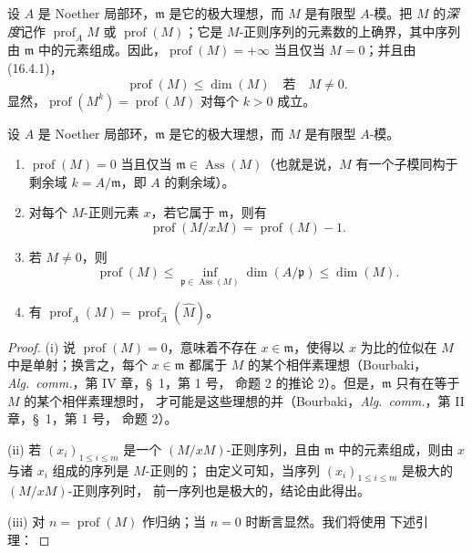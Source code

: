 \begin{definition}[16.4.5]
\label{0.16.4.5-fr}
设 $A$ 是 Noether 局部环，$\mathfrak{m}$ 是它的极大理想，而 $M$ 是有限型
$A$-模。把 $M$ 的\emph{深度}记作 $\operatorname{prof}_A M$ 或
$\operatorname{prof}(M)$；它是 $M$-正则序列的元素数的上确界，其中序列由
$\mathfrak{m}$ 中的元素组成。因此，$\operatorname{prof}(M)=+\infty$ 当且仅当
$M=0$；并且由 (16.4.1)，
\begin{equation}
\label{0.16.4.5.1-fr}
\tag{16.4.5.1}
  \operatorname{prof}(M)\leq\dim(M)\quad\text{若}\quad M\neq0.
\end{equation}
显然，$\operatorname{prof}(M^k)=\operatorname{prof}(M)$ 对每个 $k>0$ 成立。
\end{definition}

\begin{proposition}[16.4.6]
\label{0.16.4.6-fr}
设 $A$ 是 Noether 局部环，$\mathfrak{m}$ 是它的极大理想，而 $M$ 是有限型
$A$-模。
\begin{enumerate}
  \item[\rm{(i)}] $\operatorname{prof}(M)=0$ 当且仅当
  $\mathfrak{m}\in\operatorname{Ass}(M)$（也就是说，$M$ 有一个子模同构于
  剩余域 $k=A/\mathfrak{m}$，即 $A$ 的剩余域）。
  \item[\rm{(ii)}] 对每个 $M$-正则元素 $x$，若它属于 $\mathfrak{m}$，则有
  \begin{equation}
  \label{0.16.4.6.1-fr}
  \tag{16.4.6.1}
    \operatorname{prof}(M/xM)=\operatorname{prof}(M)-1.
  \end{equation}
  \item[\rm{(iii)}] 若 $M\neq0$，则
  \begin{equation}
  \label{0.16.4.6.2-fr}
  \tag{16.4.6.2}
    \operatorname{prof}(M)
    \leq\inf_{\mathfrak{p}\in\operatorname{Ass}(M)}\dim(A/\mathfrak{p})
    \leq\dim(M).
  \end{equation}
  \item[\rm{(iv)}] 有
  $\operatorname{prof}_A(M)=
  \operatorname{prof}_{\widehat{A}}(\widehat{M})$。
\end{enumerate}
\end{proposition}

\begin{proof}
(i) 说 $\operatorname{prof}(M)=0$，意味着不存在 $x\in\mathfrak{m}$，使得以
$x$ 为比的位似在 $M$ 中是单射；换言之，每个 $x\in\mathfrak{m}$ 都属于 $M$
的某个相伴素理想（Bourbaki，\emph{Alg.~comm.}，第 IV 章，\S~1，第 1 号，
命题 2 的推论 2）。但是，$\mathfrak{m}$ 只有在等于 $M$ 的某个相伴素理想时，
才可能是这些理想的并（Bourbaki，\emph{Alg.~comm.}，第 II 章，\S~1，第 1 号，
命题 2）。

(ii) 若 $(x_i)_{1\leq i\leq m}$ 是一个 $(M/xM)$-正则序列，且由
$\mathfrak{m}$ 中的元素组成，则由 $x$ 与诸 $x_i$ 组成的序列是 $M$-正则的；
由定义可知，当序列 $(x_i)_{1\leq i\leq m}$ 是极大的 $(M/xM)$-正则序列时，
前一序列也是极大的，结论由此得出。

(iii) 对 $n=\operatorname{prof}(M)$ 作归纳；当 $n=0$ 时断言显然。我们将使用
下述引理：
\end{proof}

